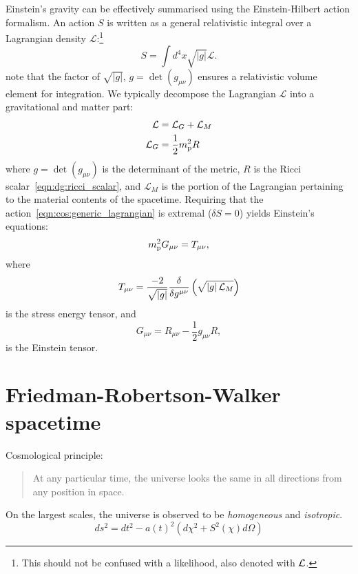 Einstein's gravity can be effectively summarised using the Einstein-Hilbert action formalism. An action $S$ is written as a general relativistic integral over a Lagrangian density $\mathcal{L}$:\footnote{This should not be confused with a likelihood, also denoted with $\mathcal{L}$.}
\begin{equation}
  S = \int d^4 x \sqrt{|g|} \mathcal{L}.
  \label{eqn:cos:generic_lagrangian}
\end{equation}
note that the factor of $\sqrt{|g|}$, $g=\det(g_{\mu\nu})$ ensures a relativistic volume element for integration.
We typically decompose the Lagrangian $\mathcal{L}$ into a gravitational and matter part:
\begin{align}
  \mathcal{L} &= \mathcal{L}_G + \mathcal{L}_M
  \label{eqn:cos:decomp}\\
  \mathcal{L}_G &= \frac{1}{2} m_{\mathrm{p}}^2 R
  \label{eqn:cos:L_grav}
\end{align}
where $g=\det(g_{\mu\nu})$ is the determinant of the metric, $R$ is the Ricci scalar~\eqref{eqn:dg:ricci_scalar}, and $\mathcal{L}_M$ is the portion of the Lagrangian pertaining to the material contents of the spacetime. Requiring that the action~\eqref{eqn:cos:generic_lagrangian} is extremal ($\delta S = 0$) yields Einstein's equations:
\begin{equation}
 m_{\mathrm{p}}^2 G_{\mu\nu} = T_{\mu\nu},
  \label{eqn:cos:einsteins_equations}
\end{equation}
where
\begin{equation}
  T_{\mu\nu} = \frac{-2}{\sqrt{\left|g\right|}}\frac{\delta}{\delta g^{\mu\nu}}\left( \sqrt{\left|g\right| \mathcal{L}_M} \right)
  \label{eqn:cos:SET_fundamantal}
\end{equation}
is the stress energy tensor, and
\begin{equation}
  G_{\mu\nu} = R_{\mu\nu} - \frac{1}{2}g_{\mu\nu} R,
  \label{eqn:cos:SET_fundamantal}
\end{equation}
is the Einstein tensor.

\section{Friedman-Robertson-Walker spacetime}

Cosmological principle:
\begin{quote}
  At any particular time, the universe looks the same in all directions from any position in space.
\end{quote}

On the largest scales, the universe is observed to be {\em homogeneous\/} and {\em isotropic}.
\begin{equation}
  ds^2 = dt^2 - a{(t)}^2\left( d\chi^2 + S^2{(\chi)} d\Omega \right)
  \label{eqn:cos:FRW_metric}
\end{equation}

